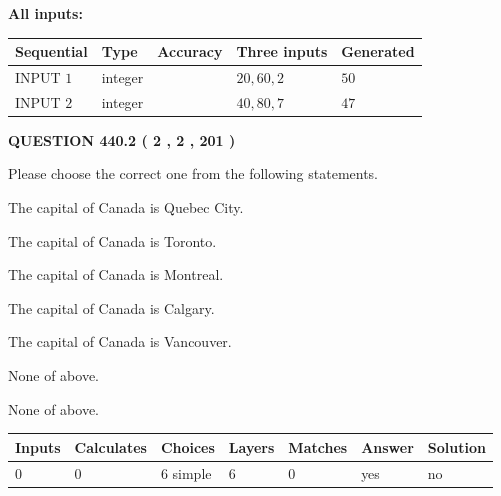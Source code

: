 \documentclass[12pt]{article}
\begin{document}
   
   
   
\noindent\vspace{0.1in}\hspace{-0.08in} {\textbf{\Large{All inputs: }}}
   
   
  
  
\noindent\begin{tabular}{|l|l|l|l|l|}
\hline
 Sequential & Type & Accuracy & Three inputs & Generated \\ 
\hline
 
 
  INPUT $  1 $ & integer &  & $
 20
 , 
 60
 , 
 2
 $ & $ 50 $ 
 \\  \hline  
 
 
  INPUT $  2 $ & integer &  & $
 40
 , 
 80
 , 
 7
 $ & $ 47 $ 
 \\  \hline  
 \end{tabular}
   
   
  
\vspace{0.2in}
  
{\textbf{\Large{QUESTION
440.2 
 ( 2 , 2 , 201 )
}}}
  
  
Please choose the correct one from the following statements.
 
 
The capital of Canada is Quebec City.
 
 
The capital of Canada is Toronto.
 
 
The capital of Canada is Montreal.
 
 
The capital of Canada is Calgary.
 
 
The capital of Canada is Vancouver.
 
 
 None of above.
 
 
\noindent{}
 
 
 None of above.
 
 
\noindent{}
 
 
   
   
   
   
\noindent\begin{tabular}{|l|l|l|l|l|l|l|}
 \hline
Inputs & Calculates & Choices & Layers & Matches & Answer & Solution \\ \hline
 0  & 
 0  & 
 6
  simple  
  & 
 6  & 
 0  & 
  yes & 
  no 
  \\ \hline
 \end{tabular}
   
\end{document}
